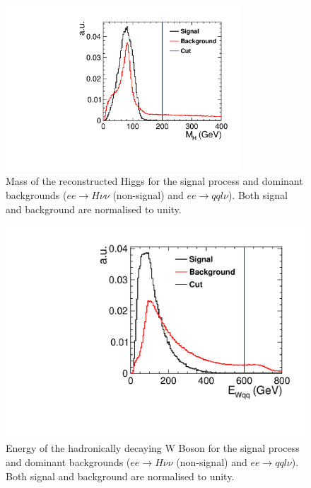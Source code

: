 \begin{figure}
  \centering
  \includegraphics[width=0.78\textwidth,keepaspectratio]{HiggsAnalysis/figures/PseudoHiggs_PreSelection}
  \caption[Reconstructed Higgs mass for signal and background events]{Mass of the reconstructed Higgs for the signal process and dominant backgrounds ($ee\rightarrow H\nu\nu$ (non-signal) and $ee\rightarrow qql\nu$). Both signal and background are normalised to unity.}
  \label{fig:HMassPreSel}
\end{figure}

\begin{figure}
  \centering
    \includegraphics[width=0.78\linewidth,keepaspectratio]{HiggsAnalysis/figures/EWqq_PreSelection}
    \caption[Energy of the hadronically decaying W Boson for signal and background events]{Energy of the hadronically decaying W Boson for the signal process and dominant backgrounds ($ee\rightarrow H\nu\nu$ (non-signal) and $ee\rightarrow qql\nu$). Both signal and background are normalised to unity.}
  \label{fig:WPreSel}
\end{figure}

